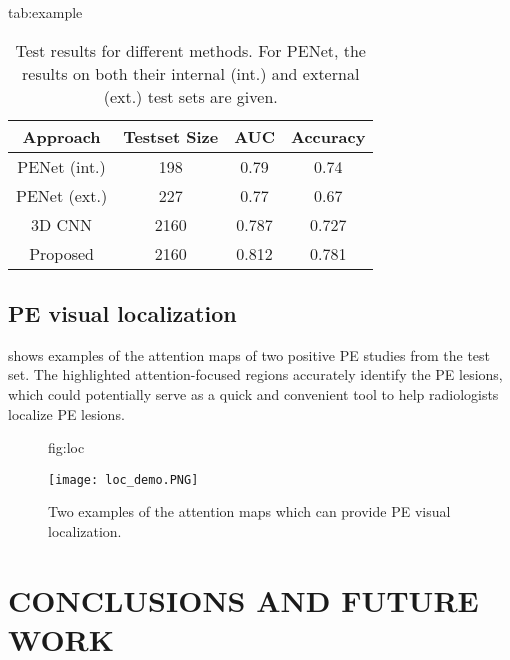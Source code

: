 \documentclass{midl} %
\begin{document}
\begin{table}[htbp]
\floatconts
  {tab:example}%
  {\caption{Test results for different methods. For PENet, the results on both their internal (int.) and external (ext.) test sets are given.}}%
  {\begin{tabular}{cccc}
  \hline
  \bfseries Approach & \bfseries Testset Size & \bfseries AUC & \bfseries Accuracy\\
  \hline
  PENet (int.) & 198 & 0.79 & 0.74\\
  PENet (ext.) & 227 & 0.77 & 0.67\\
  3D CNN & 2160 & 0.787 & 0.727\\
  Proposed & 2160 & 0.812 & 0.781\\
  \hline
  \end{tabular}}
\end{table}

\subsection{PE visual localization}
\label{ssec:localization}

 shows examples of the attention maps of two positive PE studies from the test set. The highlighted attention-focused regions accurately identify the PE lesions, which could potentially serve as a quick and convenient tool to help radiologists localize PE lesions. 

\begin{figure}[htbp]
\floatconts
  {fig:loc}
  {\caption{Two examples of the attention maps which can provide PE visual localization.}}
  {\texttt{[image: loc\_demo.PNG]}}
\end{figure}

\section{CONCLUSIONS AND FUTURE WORK}
\label{sec:conclusions}
\end{document}
